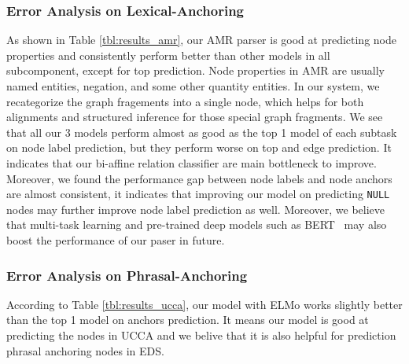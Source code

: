 \subsubsection{Error Analysis on Lexical-Anchoring}
As shown in Table \ref{tbl:results_amr}, our AMR parser is good at
predicting node properties and consistently perform better than other
models in all subcomponent, except for top prediction. Node properties
in AMR are usually named entities, negation, and some other quantity
entities. In our system, we recategorize the graph fragements into a
single node, which helps for both alignments and structured inference
for those special graph fragments. We see that all our 3 models
perform almost as good as the top 1 model of each subtask on node
label prediction, but they perform worse on top and edge
prediction. It indicates that our bi-affine relation classifier are
main bottleneck to improve. Moreover, we found the performance gap
between node labels and node anchors are almost consistent, it
indicates that improving our model on predicting \texttt{NULL} nodes may
further improve node label prediction as well.  Moreover, we believe
that multi-task learning and pre-trained deep models such as
BERT~\cite{devlin2018bert} may also boost the performance of our paser
in future.

\subsubsection{Error Analysis on Phrasal-Anchoring}

According to Table \ref{tbl:results_ucca}, our model with ELMo works
slightly better than the top 1 model on anchors prediction. It means
our model is good at predicting the nodes in UCCA and we belive that
it is also helpful for prediction phrasal anchoring nodes in EDS.

